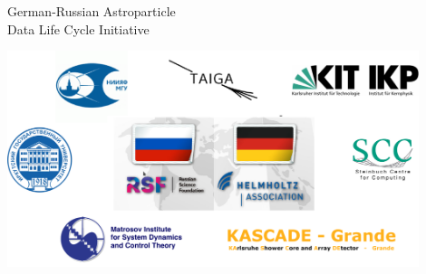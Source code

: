 \begin{frame}{German-Russian Astroparticle \\Data Life Cycle Initiative\footnotemark[1]}
\vspace{-1.4em}
\begin{center}
  \includegraphics[width=0.9\textwidth]{pics/Collab-3.pdf}
\end{center}
\footnotesize{}
\end{frame}


